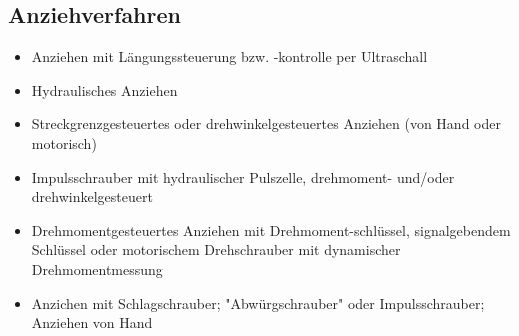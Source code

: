 \subsection{Anziehverfahren}
\begin{itemize}
    \item Anziehen mit Längungssteuerung bzw. -kontrolle per Ultraschall\\
    \item Hydraulisches Anziehen\\
    \item Streckgrenzgesteuertes oder drehwinkelgesteuertes Anziehen (von Hand oder motorisch)\\
    \item Impulsschrauber mit hydraulischer Pulszelle, drehmoment- und/oder drehwinkelgesteuert\\
    \item Drehmomentgesteuertes Anziehen mit Drehmoment-schlüssel, signalgebendem Schlüssel oder motorischem Drehschrauber mit dynamischer Drehmomentmessung\\
    \item Anzichen mit Schlagschrauber; "Abwürgschrauber" oder Impulsschrauber; Anziehen von Hand
\end{itemize}